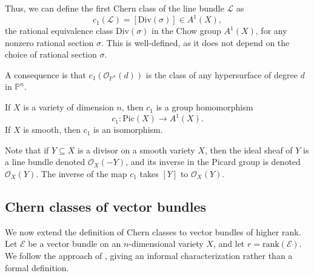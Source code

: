 Thus, we can define the first Chern class of the line bundle $\mathcal{L}$ as
\[c_1(\mathcal{L}) = [\mathrm{Div}(\sigma)] \in A^1(X),\]
the rational equivalence class $\mathrm{Div}(\sigma)$  in the Chow group $A^1(X)$, for any nonzero rational section $\sigma$. This is well-defined, as it does not depend on the choice of rational section $\sigma$.

\begin{example}
    A consequence is that $c_1(\mathcal{O}_{\mathbb{P}^n}(d))$ is the class of any hypersurface of degree $d$ in $\mathbb{P}^n$.
\end{example}


\begin{proposition}
    If $X$ is a variety of dimension $n$, then $c_1$ is a group homomorphism
    \[c_1 \colon \mathrm{Pic}(X) \to A^1(X).\]
    If $X$ is smooth, then $c_1$ is an isomorphism.
\end{proposition}

Note that if $Y \subseteq X$ is a divisor on a smooth variety $X$, then the ideal sheaf of $Y$ is a line bundle denoted $\mathcal{O}_X(-Y)$, and its inverse in the Picard group is denoted $\mathcal{O}_X(Y)$. The inverse of the map $c_1$ takes $[Y]$ to $\mathcal{O}_X(Y)$.

\subsection{Chern classes of vector bundles}

We now extend the definition of Chern classes to vector bundles of higher rank. Let $\mathcal{E}$ be a vector bundle on an $n$-dimensional variety $X$, and let $r = \mathrm{rank}(\mathcal{E})$. We follow the approach of \cite[Section 5.2]{EH16}, giving an informal characterization rather than a formal definition.

